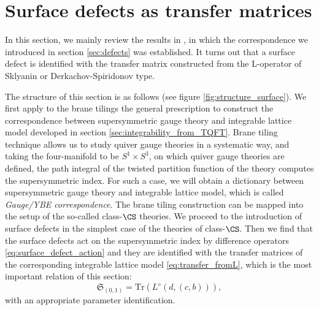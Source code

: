 \begin{comment}
\documentclass[11pt]{article}  %
\usepackage{Common/toshi}

\end{comment}






\section{Surface defects as transfer matrices}
\label{sec:surface}


In this section, we mainly review the results in \cite{Maruyoshi:2016caf},
in which the correspondence we introduced in section \ref{sec:defects} was established.
It turns out that a surface defect is identified with the transfer matrix
constructed from the L-operator of Sklyanin or Derkachov-Spiridonov type.

The structure of this section is as follows (see figure \ref{fig:structure_surface}).
We first apply to the brane tilings the general prescription to construct
the correspondence between supersymmetric gauge theory
and integrable lattice model developed in section \ref{sec:integrability_from_TQFT}.
Brane tiling technique allows us to study quiver gauge theories in a systematic way,
and taking the four-manifold to be $S^{1}\times S^{3}$,
on which quiver gauge theories are defined, the path integral of the
twisted partition function of the theory computes the supersymmetric index.
For such a case, we will obtain a dictionary between supersymmetric gauge theory and
integrable lattice model, which is called \emph{Gauge/YBE correspondence}.
The brane tiling construction can be mapped into the setup of the so-called class-$\CS$ theories.
We proceed to the introduction of surface defects in the simplest case of the theories of class-$\CS$.
Then we find that the surface defects act on the supersymmetric index by
difference operators \eqref{eq:surface_defect_action} and they are identified with the transfer matrices
of the corresponding integrable lattice model \eqref{eq:transfer_fromL}, which is the most important
relation of this section:
\begin{equation}
  \mathfrak{S}_{(0,1)} = \mathrm{Tr}\left( L^{\diamond}(d, (c,b)) \right),
\end{equation}
with an appropriate parameter identification.



